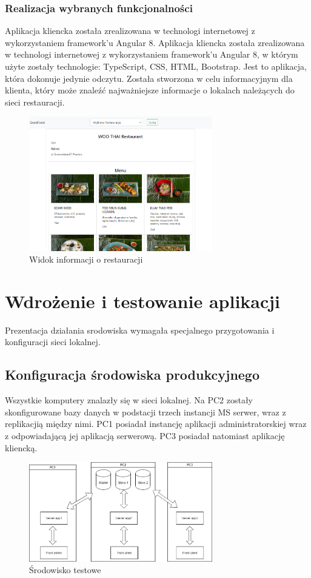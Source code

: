 \documentclass{article}
\begin{document}
		\subsubsection{Realizacja wybranych funkcjonalności}	
		Aplikacja kliencka została zrealizowana w technologi internetowej z wykorzystaniem framework'u Angular 8.
		Aplikacja kliencka została zrealizowana w technologi internetowej z wykorzystaniem framework'u Angular 8, w którym użyte zostały technologie:  TypeScript, CSS, HTML, Bootstrap.
		Jest to aplikacja, która dokonuje jedynie odczytu. Została stworzona w celu informacyjnym dla klienta, który może znaleźć najważniejsze informacje o lokalach należących do sieci restauracji.
			\begin{figure}[hbt!]
				\includegraphics[width=8cm]{Files/Pictures/Info_C}
				\centering
				\caption{Widok informacji o restauracji}
			\end{figure}
\newpage
\section{Wdrożenie i testowanie aplikacji}
Prezentacja działania srodowiska wymagała specjalnego przygotowania i konfiguracji sieci lokalnej.
\subsection{Konfiguracja środowiska produkcyjnego}
	Wszystkie komputery znalazły się w sieci lokalnej. Na PC2 zostały skonfigurowane bazy danych w podstacji trzech instancji MS serwer, wraz z replikacjią między nimi. PC1 posiadał instancję aplikacji administratorskiej wraz z odpowiadającą jej aplikacją serwerową. PC3 posiadał natomiast aplikację kliencką.


	\begin{figure}[hbt!]
		\includegraphics[width=8cm]{Files/Pictures/setup}
		\centering
		\caption{Środowisko testowe}
	\end{figure}
\end{document}
